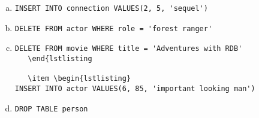 \documentclass[11pt,a4paper,DIV=9]{scrartcl}
\begin{document}
   \begin{enumerate}[a)]
   \item \begin{lstlisting} 
INSERT INTO connection VALUES(2, 5, 'sequel') 
   \end{lstlisting}
   
   \item \begin{lstlisting} 
DELETE FROM actor WHERE role = 'forest ranger'
      \end{lstlisting}

   \item \begin{lstlisting} 
DELETE FROM movie WHERE title = 'Adventures with RDB'
   \end{lstlisting

   \item \begin{lstlisting} 
INSERT INTO actor VALUES(6, 85, 'important looking man')
   \end{lstlisting}

   \item \begin{lstlisting} 
DROP TABLE person
   \end{lstlisting}

 \end{enumerate}   
\end{document}
